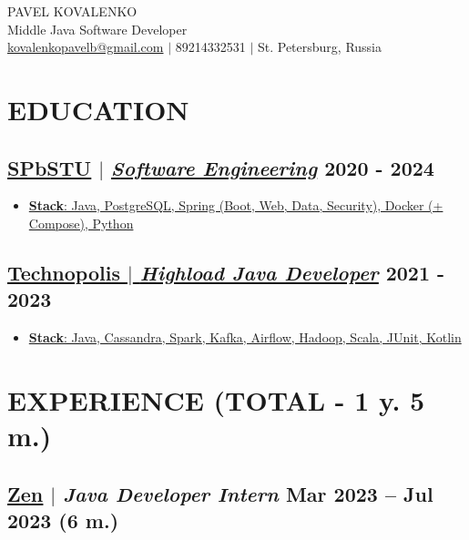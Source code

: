 \documentclass[11pt]{article}
\begin{document}
\begin{center}
    {\fontsize{36}{36}\selectfont PAVEL KOVALENKO} \\ \bigskip
    {\fontsize{25}{25}\selectfont Middle Java Software Developer} \\ \bigskip
    {\color{icnclr}\faEnvelope[email]} \href{mailto:kovalenkopavelb@gmail.com}{kovalenkopavelb@gmail.com} $|$ 
    {\color{icnclr}} 89214332531 $|$
    {\color{icnclr}\faMapMarker} St. Petersburg, Russia
\end{center}

\section{EDUCATION}
\subsection{\href{https://www.spbstu.ru/}{\underline{SPbSTU}} $|$ {\normalfont\textit{\href{https://www.spbstu.ru/structure/graduate_school_software_engineering/}{\underline{Software Engineering}}}} \hfill 2020 - 2024}
\begin{itemize}
    \item \underline{\textbf{Stack}: Java, PostgreSQL, Spring (Boot, Web, Data, Security), Docker (+ Compose), Python}
\end{itemize}

\subsection{\href{https://polis.vk.company/}{\underline{Technopolis} $|$ {\normalfont\textit{\underline{Highload Java Developer}}}} \hfill 2021 - 2023}
\begin{itemize}
    \item \underline{\textbf{Stack}: Java, Cassandra, Spark, Kafka, Airflow, Hadoop, Scala, JUnit, Kotlin}
\end{itemize}

\section{EXPERIENCE (TOTAL - 1 y. 5 m.)}
\subsection{\href{https://dzen.ru}{\underline{Zen}} $|$ {\normalfont\textit{Java Developer Intern}} \hfill Mar 2023 -- Jul 2023 (6 m.)}
\end{document}
